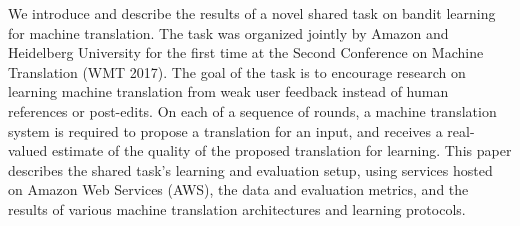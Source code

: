 We introduce and describe the results of a novel shared task on bandit learning for machine translation. The task was organized jointly by Amazon and Heidelberg University for the first time at the Second Conference on Machine Translation (WMT 2017). The goal of the task is to encourage research on learning machine translation from weak user feedback instead of human references or post-edits. On each of a sequence of rounds, a machine translation system is required to propose a translation for an input, and receives a real-valued estimate of the quality of the proposed translation for learning. This paper describes the shared task's learning and evaluation setup, using services hosted on Amazon Web Services (AWS), the data and evaluation metrics, and the results of various machine translation architectures and learning protocols.
